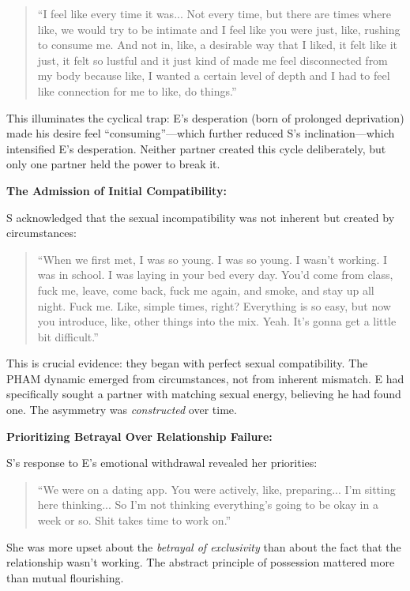 \documentclass[12pt, letterpaper]{article}
\begin{document}
\begin{quote}
``I feel like every time it was... Not every time, but there are times where like, we would try to be intimate and I feel like you were just, like, rushing to consume me. And not in, like, a desirable way that I liked, it felt like it just, it felt so lustful and it just kind of made me feel disconnected from my body because like, I wanted a certain level of depth and I had to feel like connection for me to like, do things.''
\end{quote}

This illuminates the cyclical trap: E's desperation (born of prolonged deprivation) made his desire feel ``consuming''---which further reduced S's inclination---which intensified E's desperation. Neither partner created this cycle deliberately, but only one partner held the power to break it.

\textbf{The Admission of Initial Compatibility:}

S acknowledged that the sexual incompatibility was not inherent but created by circumstances:

\begin{quote}
``When we first met, I was so young. I was so young. I wasn't working. I was in school. I was laying in your bed every day. You'd come from class, fuck me, leave, come back, fuck me again, and smoke, and stay up all night. Fuck me. Like, simple times, right? Everything is so easy, but now you introduce, like, other things into the mix. Yeah. It's gonna get a little bit difficult.''
\end{quote}

This is crucial evidence: they began with perfect sexual compatibility. The PHAM dynamic emerged from circumstances, not from inherent mismatch. E had specifically sought a partner with matching sexual energy, believing he had found one. The asymmetry was \textit{constructed} over time.

\textbf{Prioritizing Betrayal Over Relationship Failure:}

S's response to E's emotional withdrawal revealed her priorities:

\begin{quote}
``We were on a dating app. You were actively, like, preparing... I'm sitting here thinking... So I'm not thinking everything's going to be okay in a week or so. Shit takes time to work on.''
\end{quote}

She was more upset about the \textit{betrayal of exclusivity} than about the fact that the relationship wasn't working. The abstract principle of possession mattered more than mutual flourishing.
\end{document}

